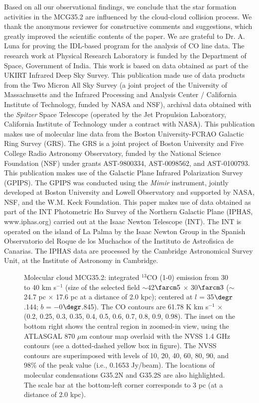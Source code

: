 \documentclass[iop]{emulateapj}
\begin{document}
Based on all our observational findings, we conclude that the star formation activities in the MCG35.2 are influenced by the cloud-cloud collision process.
%
\acknowledgments
%
We thank the anonymous reviewer for constructive comments and suggestions, which greatly improved the scientific contents of the paper. 
We are grateful to Dr. A. Luna for proving the IDL-based program for the analysis of CO line data. 
The research work at Physical Research Laboratory is funded by the Department of Space, Government of India. 
This work is based on data obtained as part of the UKIRT Infrared Deep Sky Survey. This publication 
made use of data products from the Two Micron All Sky Survey (a joint project of the University of Massachusetts and 
the Infrared Processing and Analysis Center / California Institute of Technology, funded by NASA and NSF), archival 
data obtained with the {\it Spitzer} Space Telescope (operated by the Jet Propulsion Laboratory, California Institute 
of Technology under a contract with NASA). 
This publication makes use of molecular line data from the Boston University-FCRAO Galactic
Ring Survey (GRS). The GRS is a joint project of Boston University and Five College Radio Astronomy Observatory, 
funded by the National Science Foundation (NSF) under grants AST-9800334, AST-0098562, and AST-0100793.  
This publication makes use of the Galactic Plane Infrared Polarization Survey (GPIPS). 
The GPIPS was conducted using the {\it Mimir} instrument, jointly developed at Boston University and Lowell Observatory
and supported by NASA, NSF, and the W.M. Keck Foundation. 
This paper makes use of data obtained as part of the INT Photometric H$\alpha$ Survey of the Northern Galactic 
Plane (IPHAS, www.iphas.org) carried out at the Isaac Newton Telescope (INT). The INT is operated on the 
island of La Palma by the Isaac Newton Group in the Spanish Observatorio del Roque de los Muchachos of 
the Instituto de Astrofisica de Canarias. The IPHAS data are processed by the Cambridge Astronomical Survey 
Unit, at the Institute of Astronomy in Cambridge.
% 
\begin{figure*}
\caption{\scriptsize Molecular cloud MCG35.2: integrated $^{13}$CO (1-0) emission from 30 to 40 km s$^{-1}$ 
(size of the selected field $\sim$42$\farcm5$ $\times$ 30$\farcm3$ ($\sim$24.7 pc $\times$ 17.6 pc at a distance of 2.0 kpc); 
centered at $l$ = 35$\degr$.144; $b$ = $-$0$\degr$.845). 
The CO contours are 61.78 K km s$^{-1}$ $\times$ (0.2, 0.25, 0.3, 0.35, 0.4, 0.5, 0.6, 0.7, 0.8, 0.9, 0.98).
The inset on the bottom right shows the central region in zoomed-in view, using the ATLASGAL 870 $\mu$m contour map 
overlaid with the NVSS 1.4 GHz contours (see a dotted-dashed yellow box in figure). 
The NVSS contours are superimposed with levels of 10, 20, 40, 60, 80, 90, and 98\% of 
the peak value (i.e., 0.1653 Jy/beam). The locations of molecular condensations G35.2N and G35.2S are also highlighted. 
The scale bar at the bottom-left corner corresponds to 3 pc (at a distance of 2.0 kpc).}
\label{fig1}
\end{figure*}
\end{document}
